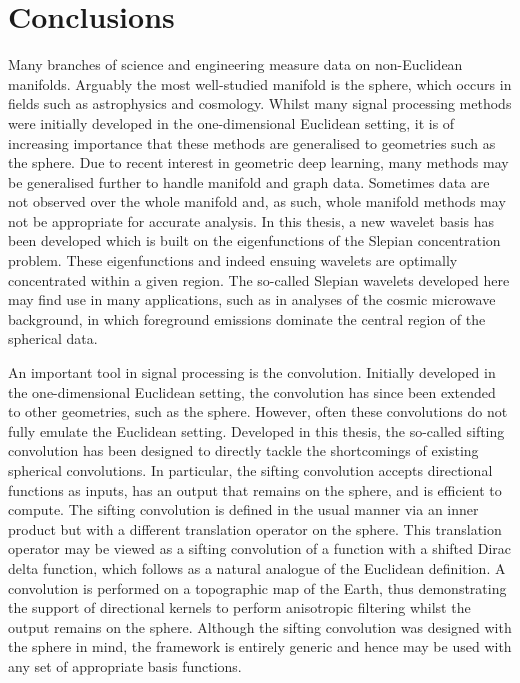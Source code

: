 \chapter{Conclusions}\label{sec:chapter6}

Many branches of science and engineering measure data on non-Euclidean manifolds.
Arguably the most well-studied manifold is the sphere, which occurs in fields such as astrophysics and cosmology.
Whilst many signal processing methods were initially developed in the one-dimensional Euclidean setting, it is of increasing importance that these methods are generalised to geometries such as the sphere.
Due to recent interest in geometric deep learning, many methods may be generalised further to handle manifold and graph data.
Sometimes data are not observed over the whole manifold and, as such, whole manifold methods may not be appropriate for accurate analysis.
In this thesis, a new wavelet basis has been developed which is built on the eigenfunctions of the Slepian concentration problem.
These eigenfunctions and indeed ensuing wavelets are optimally concentrated within a given region.
The so-called Slepian wavelets developed here may find use in many applications, such as in analyses of the cosmic microwave background, in which foreground emissions dominate the central region of the spherical data.

An important tool in signal processing is the convolution.
Initially developed in the one-dimensional Euclidean setting, the convolution has since been extended to other geometries, such as the sphere.
However, often these convolutions do not fully emulate the Euclidean setting.
Developed in this thesis, the so-called sifting convolution has been designed to directly tackle the shortcomings of existing spherical convolutions.
In particular, the sifting convolution accepts directional functions as inputs, has an output that remains on the sphere, and is efficient to compute.
The sifting convolution is defined in the usual manner via an inner product but with a different translation operator on the sphere.
This translation operator may be viewed as a sifting convolution of a function with a shifted Dirac delta function, which follows as a natural analogue of the Euclidean definition.
A convolution is performed on a topographic map of the Earth, thus demonstrating the support of directional kernels to perform anisotropic filtering whilst the output remains on the sphere.
Although the sifting convolution was designed with the sphere in mind, the framework is entirely generic and hence may be used with any set of appropriate basis functions.

